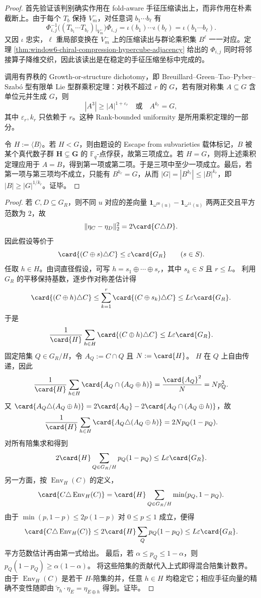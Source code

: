\begin{proof}
首先验证该判别确实作用在 fold-aware 手征压缩读出上，而非作用在朴素截断上。由于每个 \(T_b\) 保持 \(V_m^-\)，对任意词 \(b_1\cdots b_\ell\) 有
\[
\Phi_{i,j}^{-1}\bigl((T_{b_1}\cdots T_{b_\ell})|_{V_m^-}\bigr)\Phi_{i,j}
=\iota(b_1)\cdots\iota(b_\ell)
=\iota(b_1\cdots b_\ell).
\]
又因 \(\iota\) 忠实，\(\ell\) 重局部变换在 \(V_m^-\) 上的压缩读出与群论乘积集 \(B^\ell\) 一一对应。定理 \ref{thm:window6-chiral-compression-hypercube-adjacency} 给出的 \(\Phi_{i,j}\) 同时将邻接算子降维交织，因此该读出是在稳定的手征压缩坐标中完成的。

调用有界秩的 Growth-or-structure dichotomy，即 Breuillard--Green--Tao--Pyber--Szabó 型有限单 Lie 型群乘积定理：对秩不超过 \(r\) 的 \(G\)，若有限对称集 \(A\subseteq G\) 含单位元并生成 \(G\)，则
\[
|A^3|\ge |A|^{1+\varepsilon_r}
\quad\text{或}\quad
A^{k_r}=G,
\]
其中 \(\varepsilon_r,k_r\) 只依赖于 \(r\)。这种 Rank-bounded uniformity 是所用乘积定理的一部分。

令 \(H:=\langle B\rangle\)。若 \(H<G\)，则由题设的 Escape from subvarieties 载体标记，\(B\) 被某个真代数子群 \(\mathbf H\subsetneq\mathbf G\) 的 \(\mathbb F_q\)-点俘获，故第三项成立。若 \(H=G\)，则将上述乘积定理应用于 \(A=B\)，得到第一项或第二项。于是三项中至少一项成立。最后，若第一项与第三项均不成立，只能有 \(B^{k_r}=G\)，从而
\(|G|=|B^{k_r}|\le |B|^{k_r}\)，即 \(|B|\ge |G|^{1/k_r}\)。证毕。
\end{proof}

\begin{proof}
若 \(C,D\subseteq G_R\)，则不同 \(u\) 对应的差向量
\(\mathbf 1_{\omega^{00}(u)}-\mathbf 1_{\omega^{11}(u)}\) 两两正交且平方范数为 \(2\)，故
\[
\|\eta_C-\eta_D\|_2^2=2\card{C\triangle D}.
\]
因此假设等价于
\[
\card{(C\oplus s)\triangle C}\le \varepsilon\card{G_R}\qquad(s\in S).
\]
任取 \(h\in H\)。由词直径假设，可写
\(h=s_1\oplus\cdots\oplus s_r\)，其中 \(s_k\in S\) 且 \(r\le L\)。
利用 \(G_R\) 的平移保持基数，逐步作对称差估计得
\[
\card{(C\oplus h)\triangle C}
\le \sum_{k=1}^r \card{(C\oplus s_k)\triangle C}
\le L\varepsilon\card{G_R}.
\]
于是
\[
\frac1{\card{H}}\sum_{h\in H}\card{(C\oplus h)\triangle C}
\le L\varepsilon\card{G_R}.
\]
固定陪集 \(Q\in G_R/H\)，令 \(A_Q:=C\cap Q\) 且 \(N:=\card{H}\)。
\(H\) 在 \(Q\) 上自由传递，因此
\[
\frac1{\card{H}}\sum_{h\in H}\card{A_Q\cap(A_Q\oplus h)}
=\frac{\card{A_Q}^2}{N}=Np_Q^2.
\]
又 \(\card{A_Q\triangle(A_Q\oplus h)}=2\card{A_Q}-2\card{A_Q\cap(A_Q\oplus h)}\)，故
\[
\frac1{\card{H}}\sum_{h\in H}\card{A_Q\triangle(A_Q\oplus h)}
=2N p_Q(1-p_Q).
\]
对所有陪集求和得到
\[
2\card{H}\sum_{Q\in G_R/H}p_Q(1-p_Q)\le L\varepsilon\card{G_R}.
\]
另一方面，按 \(\operatorname{Env}_H(C)\) 的定义，
\[
\card{C\triangle\operatorname{Env}_H(C)}
=\card{H}\sum_{Q\in G_R/H}\min(p_Q,1-p_Q).
\]
由于 \(\min(p,1-p)\le2p(1-p)\) 对 \(0\le p\le1\) 成立，便得
\[
\card{C\triangle\operatorname{Env}_H(C)}
\le 2\card{H}\sum_Qp_Q(1-p_Q)\le L\varepsilon\card{G_R}.
\]
平方范数估计再由第一式给出。
最后，若 \(\alpha\le p_Q\le1-\alpha\)，则 \(p_Q(1-p_Q)\ge\alpha(1-\alpha)\)。
将这些陪集的贡献代入上式即得混合陪集计数界。
由于 \(\operatorname{Env}_H(C)\) 是若干 \(H\)-陪集的并，任意 \(h\in H\) 均稳定它；相应手征向量的精确不变性随即由 \(\widetilde\tau_h\cdot\eta_E=\eta_{E\oplus h}\) 得到。证毕。
\end{proof}

